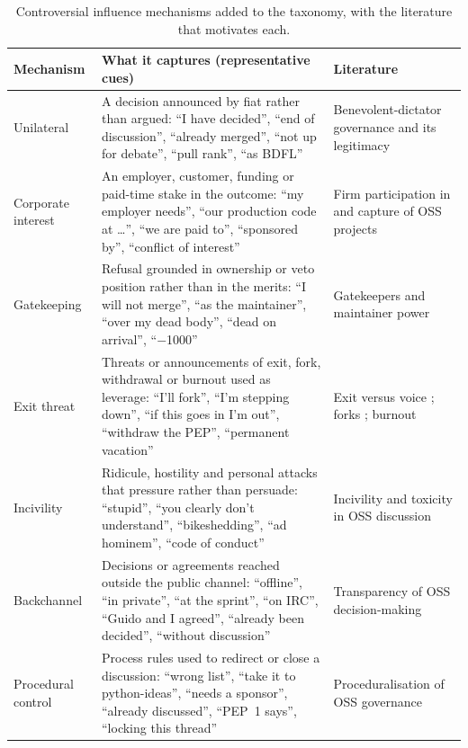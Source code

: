 \begin{table}[t]
\caption{Controversial influence mechanisms added to the taxonomy, with the literature that motivates each.}
\label{tab:controversial}
\small
\begin{tabular}{p{}p{}p{}}
\toprule
Mechanism & What it captures (representative cues) & Literature \\
\midrule
Unilateral & A decision announced by fiat rather than argued: ``I have decided'', ``end of discussion'', ``already merged'', ``not up for debate'', ``pull rank'', ``as BDFL'' & Benevolent-dictator governance and its legitimacy \cite{raymond1999, omahony2007} \\
Corporate interest & An employer, customer, funding or paid-time stake in the outcome: ``my employer needs'', ``our production code at \ldots'', ``we are paid to'', ``sponsored by'', ``conflict of interest'' & Firm participation in and capture of OSS projects \cite{dahlander2005, riehle2007, zhang2020} \\
Gatekeeping & Refusal grounded in ownership or veto position rather than in the merits: ``I will not merge'', ``as the maintainer'', ``over my dead body'', ``dead on arrival'', ``$-$1000'' & Gatekeepers and maintainer power \cite{ducheneaut2005, jensen2007} \\
Exit threat & Threats or announcements of exit, fork, withdrawal or burnout used as leverage: ``I'll fork'', ``I'm stepping down'', ``if this goes in I'm out'', ``withdraw the PEP'', ``permanent vacation'' & Exit versus voice \cite{hirschman1970}; forks \cite{robles2012, gamalielsson2014}; burnout \cite{raman2020} \\
Incivility & Ridicule, hostility and personal attacks that pressure rather than persuade: ``stupid'', ``you clearly don't understand'', ``bikeshedding'', ``ad hominem'', ``code of conduct'' & Incivility and toxicity in OSS discussion \cite{ferreira2021, squire2015, raman2020} \\
Backchannel & Decisions or agreements reached outside the public channel: ``offline'', ``in private'', ``at the sprint'', ``on IRC'', ``Guido and I agreed'', ``already been decided'', ``without discussion'' & Transparency of OSS decision-making \cite{schneider2016, omahony2007} \\
Procedural control & Process rules used to redirect or close a discussion: ``wrong list'', ``take it to python-ideas'', ``needs a sponsor'', ``already discussed'', ``PEP~1 says'', ``locking this thread'' & Proceduralisation of OSS governance \cite{delaat2007, fitzgerald2006} \\
\bottomrule
\end{tabular}
\end{table}

